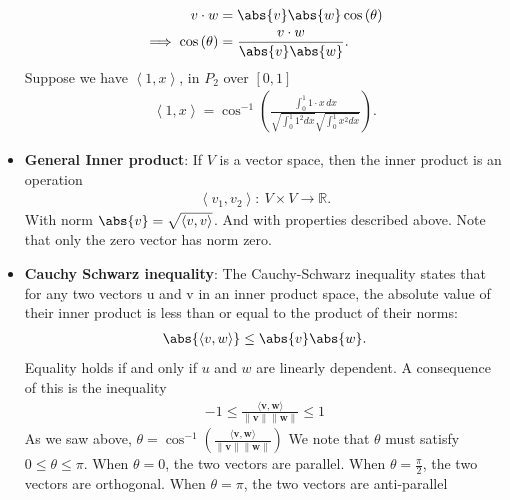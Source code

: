 \documentclass{report}
\begin{document}
\begin{itemize}
            \begin{align*}
                v \cdot w&= \abs{v}\abs{w}\cos{\left(\theta \right)} \\
                \implies \cos{\left(\theta \right)} &= \frac{v \cdot w}{\abs{v}\abs{w}}
            .\end{align*}
            Suppose we have $\left\langle 1,x \right\rangle$, in $P_{2}$ over $[0,1]$
            \begin{align*}
                \left\langle 1,x \right\rangle = \cos^{-1}{\left(\frac{\int_{0}^{1}  1 \cdot x\, dx}{\sqrt{\int_0^1 1^{2}dx} \sqrt{\int_0^1 x^{2}dx}}\right)}
            .\end{align*}
        \item \textbf{General Inner product}: If $V$ is a vector space, then the inner product is an operation
            \begin{align*}
                \left\langle  v_{1}, v_{2}\right\rangle:\ V\times V \to \mathbb{R}
            .\end{align*}
            With norm $\abs{v} = \sqrt{\left\langle v,v \right\rangle} $. And with properties described above. Note that only the zero vector has norm zero.
        \item \textbf{Cauchy Schwarz inequality}: The Cauchy-Schwarz inequality states that for any two vectors u and v in an inner product space, the absolute value of their inner product is less than or equal to the product of their norms:
            \begin{align*}
                \abs{\left\langle v,w \right\rangle} \leq \abs{v}\abs{w}
            .\end{align*}
            \bigbreak \noindent 
            Equality holds if and only if $u$ and $w$ are linearly dependent.
            \bigbreak \noindent 
            A consequence of this is the inequality
            \begin{align*}
                -1 \leq \frac{\langle \mathbf{v}, \mathbf{w} \rangle}{\|\mathbf{v}\| \|\mathbf{w}\|} \leq 1
            \end{align*}
            \bigbreak \noindent 
            As we saw above, $\theta  = \cos^{-1}{\left(\frac{\langle \mathbf{v}, \mathbf{w} \rangle}{\|\mathbf{v}\| \|\mathbf{w}\|}\right)} $
            \bigbreak \noindent 
            We note that $\theta$ must satisfy $0 \leq \theta  \leq \pi$. When $\theta  = 0$, the two vectors are parallel. When $\theta  =  \frac{\pi}{2}$, the two vectors are orthogonal. When $ \theta  = \pi$, the two vectors are anti-parallel

\end{itemize}
\end{document}
